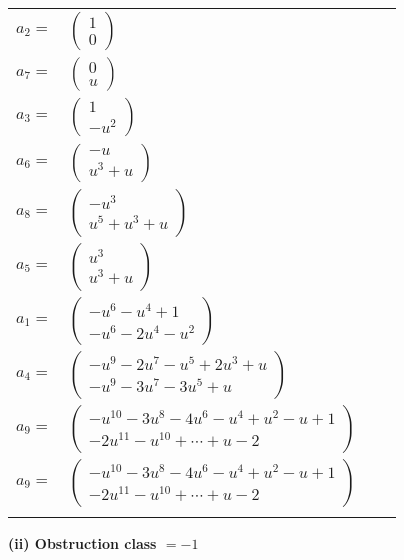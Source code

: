 \documentclass[1p]{elsarticle_modified}
\theoremstyle{definition}
\begin{document}
\begin{tabular}{m{7pt} m{180pt} m{7pt} m{180pt} }
\flushright $a_{2}=$&$\begin{pmatrix}1\\0\end{pmatrix}$ \\
\flushright $a_{7}=$&$\begin{pmatrix}0\\u\end{pmatrix}$ \\
\flushright $a_{3}=$&$\begin{pmatrix}1\\- u^2\end{pmatrix}$ \\
\flushright $a_{6}=$&$\begin{pmatrix}- u\\u^3+u\end{pmatrix}$ \\
\flushright $a_{8}=$&$\begin{pmatrix}- u^3\\u^5+u^3+u\end{pmatrix}$ \\
\flushright $a_{5}=$&$\begin{pmatrix}u^3\\u^3+u\end{pmatrix}$ \\
\flushright $a_{1}=$&$\begin{pmatrix}- u^6- u^4+1\\- u^6-2 u^4- u^2\end{pmatrix}$ \\
\flushright $a_{4}=$&$\begin{pmatrix}- u^9-2 u^7- u^5+2 u^3+u\\- u^9-3 u^7-3 u^5+u\end{pmatrix}$ \\
\flushright $a_{9}=$&$\begin{pmatrix}- u^{10}-3 u^8-4 u^6- u^4+u^2- u+1\\-2 u^{11}- u^{10}+\cdots+u-2\end{pmatrix}$\\ \flushright $a_{9}=$&$\begin{pmatrix}- u^{10}-3 u^8-4 u^6- u^4+u^2- u+1\\-2 u^{11}- u^{10}+\cdots+u-2\end{pmatrix}$\\&\end{tabular}
\flushleft \textbf{(ii) Obstruction class $= -1$}\\~\\
\end{document}
